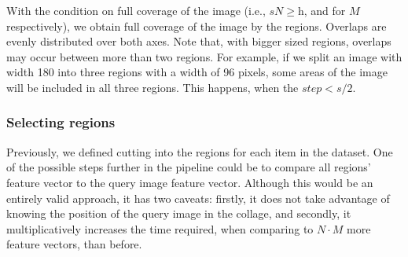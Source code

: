 With the condition on full coverage of the image (i.e., $s N \geq \text{h}$, and for $M$ respectively), we obtain full coverage of the image by the regions. Overlaps are evenly distributed over both axes. Note that, with bigger sized regions, overlaps may occur between more than two regions. For example, if we split an image with width 180 into three regions with a width of 96 pixels, some areas of the image will be included in all three regions. This happens, when the $step < s/2$.





\subsubsection{Selecting regions}

Previously, we defined cutting into the regions for each item in the dataset. One of the possible steps further in the pipeline could be to compare all regions' feature vector to the query image feature vector. Although this would be an entirely valid approach, it has two caveats: firstly, it does not take advantage of knowing the position of the query image in the collage, and secondly, it multiplicatively increases the time required, when comparing to $N \cdot M$ more feature vectors, than before.

